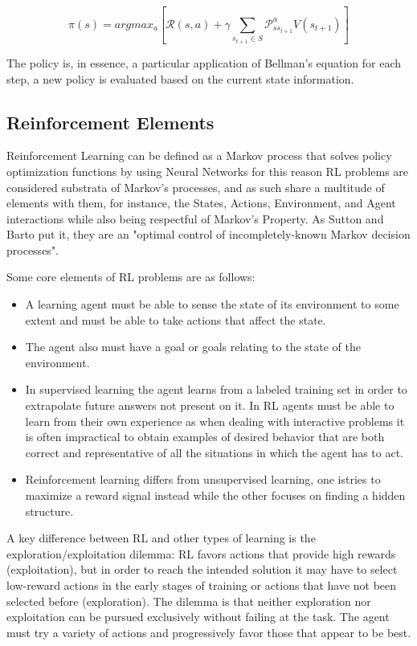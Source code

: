 \begin{equation}
    \label{eq:optimal_policy}
    \pi(s) = argmax_a[\mathcal{R}(s,a) + \gamma \sum_{s_{t+1} \in S}\mathcal{P}_{ss_{t+1}}^a V(s_{t+1})]
\end{equation}

The policy is, in essence, a particular application of Bellman's equation for each step, a new policy is evaluated based on the current state information.

\subsection*{Reinforcement Elements}

Reinforcement Learning can be defined as a Markov process that solves policy optimization functions by using Neural Networks for this reason RL problems are considered substrata of Markov's processes, and as such share a multitude of elements with them, for instance, the States, Actions, Environment, and Agent interactions while also being respectful of Markov's Property. As Sutton and Barto put it, they are an "optimal control of incompletely-known Markov decision processes\cite{sutton2018reinforcement}".

Some core elements of RL problems are as follows:

\begin{itemize}
    \item A learning agent must be able to sense the state of its environment to some extent and must be able to take actions that affect the state.
    \item The agent also must have a goal or goals relating to the state of the environment.
    \item In supervised learning the agent learns from a labeled training set in order to extrapolate future answers not present on it. In RL agents must be able to learn from their own experience as when dealing with interactive problems it is often impractical to obtain examples of desired behavior that are both correct and representative of all the situations in which the agent has to act.
    \item Reinforcement learning differs from unsupervised learning, one istries to maximize a reward signal instead while the other focuses on finding a hidden structure.
\end{itemize}

A key difference between RL and other types of learning is the exploration/exploitation dilemma: RL favors actions that provide high rewards (exploitation), but in order to reach the intended solution it may have to select low-reward actions in the early stages of training or actions that have not been selected before (exploration). The dilemma is that neither exploration nor exploitation can be pursued exclusively without failing at the task. The agent must try a variety of actions and progressively favor those that appear to be best.

